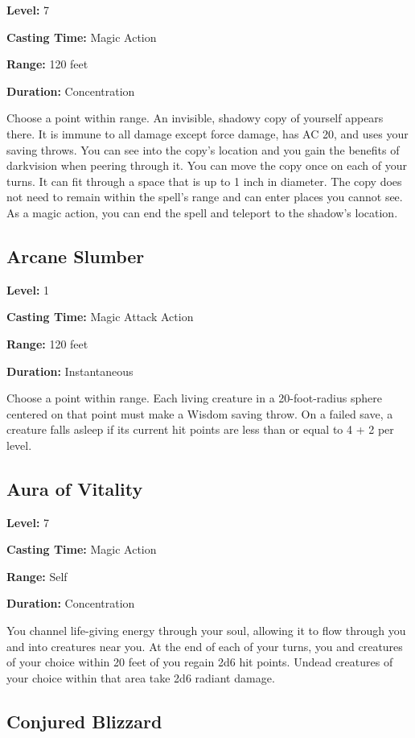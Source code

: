 \documentclass[12pt,letterpaper,twocolumn,openany,nodeprecatedcode,bg=none]{dndbook}
\begin{document}
\textbf{Level:} 7

\textbf{Casting Time:} Magic Action

\textbf{Range:} 120 feet

\textbf{Duration:} Concentration

Choose a point within range. An invisible, shadowy copy of yourself
appears there. It is immune to all damage except force damage, has AC
20, and uses your saving throws. You can see into the copy's location
and you gain the benefits of darkvision when peering through it. You can
move the copy once on each of your turns. It can fit through a space
that is up to 1 inch in diameter. The copy does not need to remain
within the spell's range and can enter places you cannot see. As a magic
action, you can end the spell and teleport to the shadow's location.

\subsection{Arcane Slumber}\label{arcane-slumber}

\textbf{Level:} 1

\textbf{Casting Time:} Magic Attack Action

\textbf{Range:} 120 feet

\textbf{Duration:} Instantaneous

Choose a point within range. Each living creature in a 20-foot-radius
sphere centered on that point must make a Wisdom saving throw. On a
failed save, a creature falls asleep if its current hit points are less
than or equal to 4 + 2 per level.

\subsection{Aura of Vitality}\label{aura-of-vitality}

\textbf{Level:} 7

\textbf{Casting Time:} Magic Action

\textbf{Range:} Self

\textbf{Duration:} Concentration

You channel life-giving energy through your soul, allowing it to flow
through you and into creatures near you. At the end of each of your
turns, you and creatures of your choice within 20 feet of you regain 2d6
hit points. Undead creatures of your choice within that area take 2d6
radiant damage.

\subsection{Conjured Blizzard}\label{conjured-blizzard}
\end{document}
